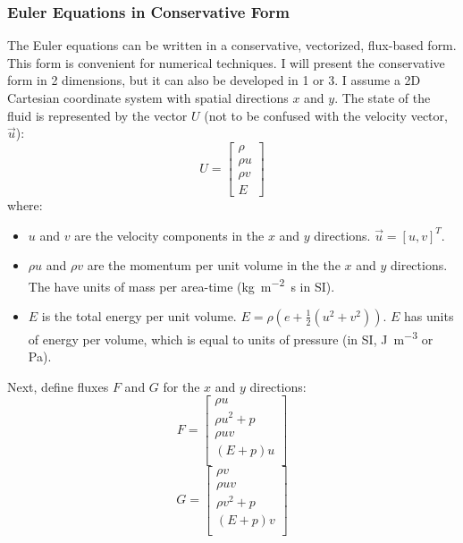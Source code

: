 \documentclass[paper=a4, fontsize=11pt]{scrartcl}
\numberwithin{equation}{section}        %
\numberwithin{figure}{section}          %
\numberwithin{table}{section}               %
\begin{document}
\subsubsection{Euler Equations in Conservative Form}
The Euler equations can be written in a conservative, vectorized, flux-based form. This form is convenient for numerical techniques. I will present the conservative form in 2 dimensions, but it can also be developed in 1 or 3. I assume a 2D Cartesian coordinate system with spatial directions $x$ and $y$. The state of the fluid is represented by the vector $U$ (not to be confused with the velocity vector, $\vec{u}$):
\begin{equation}
    U = 
    \begin{bmatrix}
        \rho \\
        \rho u \\
        \rho v \\
        E
    \end{bmatrix}
\end{equation}
where:
\begin{itemize}
    \item $u$ and $v$ are the velocity components in the $x$ and $y$ directions. $\vec{u} = [u, v]^T$.
    \item $\rho u$ and $\rho v$ are the momentum per unit volume in the the $x$ and $y$ directions. The have units of mass per area-time (\si{\kilo\gram\per\meter\squared\second} in SI).
    \item $E$ is the total energy per unit volume. $E = \rho (e + \frac{1}{2}(u^2 + v^2))$. $E$ has units of energy per volume, which is equal to units of pressure (in SI, \si{\joule\per\meter\cubed} or \si{\pascal}).
\end{itemize}

Next, define fluxes $F$ and $G$ for the $x$ and $y$ directions:
\begin{equation}
    F = 
        \begin{bmatrix}
            \rho u \\
            \rho u^2 + p \\
            \rho u v \\
            (E + p)u \\
        \end{bmatrix}
\end{equation}
\begin{equation}
    G = 
        \begin{bmatrix}
            \rho v \\
            \rho u v \\
            \rho v^2 + p \\
            (E + p)v \\
        \end{bmatrix}
\end{equation}
\end{document}
